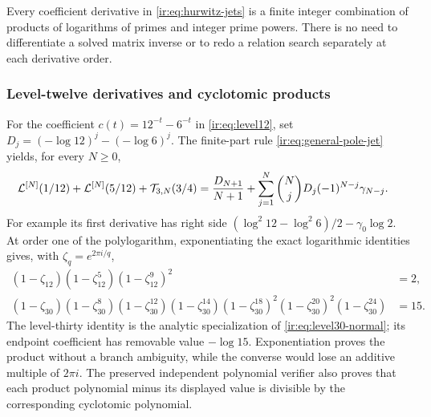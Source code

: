 Every coefficient derivative in \eqref{ir:eq:hurwitz-jets} is a finite
integer combination of products of logarithms of primes and integer
prime powers. There is no need to differentiate a solved matrix inverse
or to redo a relation search separately at each derivative order.

\subsubsection{Level-twelve derivatives and cyclotomic products}
For the coefficient $c(t)=12^{-t}-6^{-t}$ in
\eqref{ir:eq:level12}, set $D_j=(-\log12)^j-(-\log6)^j$.
The finite-part rule \eqref{ir:eq:general-pole-jet} yields, for every $N\ge0$,
\begin{align}
 \mathcal L^{[N]}(1/12)+\mathcal L^{[N]}(5/12)
 +\mathcal T_{3,N}(3/4)
 &=\frac{D_{N+1}}{N+1}
 +\sum_{j=1}^N\binom Nj D_j(-1)^{N-j}\gamma_{N-j}.
\end{align}
For example its first derivative has right side
$(\log^2 12-\log^2 6)/2-\gamma_0\log2$.
At order one of the polylogarithm, exponentiating the exact logarithmic
identities gives, with $\zeta_q=e^{2\pi i/q}$,
\begin{align}
 (1-\zeta_{12})(1-\zeta_{12}^5)(1-\zeta_{12}^9)^2&=2,\\
 (1-\zeta_{30})(1-\zeta_{30}^8)(1-\zeta_{30}^{12})
 (1-\zeta_{30}^{14})(1-\zeta_{30}^{18})^2
 (1-\zeta_{30}^{20})^2(1-\zeta_{30}^{24})&=15.
\end{align}
The level-thirty identity is the analytic specialization of
\eqref{ir:eq:level30-normal}; its endpoint coefficient has removable
value $-\log15$. Exponentiation proves the product without a branch
ambiguity, while the converse would lose an additive multiple of
$2\pi i$. The preserved independent polynomial verifier also proves
that each product polynomial minus its displayed value is divisible
by the corresponding cyclotomic polynomial.

